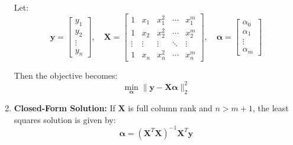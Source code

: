 \begin{example}
\begin{enumerate}
        Let:
        \[
        \mathbf{y} = 
        \begin{bmatrix} 
        y_1 \\ 
        y_2 \\ 
        \vdots \\ 
        y_n 
        \end{bmatrix}, \quad 
        \mathbf{X} = 
        \begin{bmatrix} 
        1 & x_1 & x_1^2 & \cdots & x_1^m \\ 
        1 & x_2 & x_2^2 & \cdots & x_2^m \\ 
        \vdots & \vdots & \vdots & \ddots & \vdots \\ 
        1 & x_n & x_n^2 & \cdots & x_n^m 
        \end{bmatrix}, \quad 
        \boldsymbol{\alpha} = 
        \begin{bmatrix} 
        \alpha_0 \\ 
        \alpha_1 \\ 
        \vdots \\ 
        \alpha_m 
        \end{bmatrix}
        \]
    
        Then the objective becomes:
        \[
        \min_{\boldsymbol{\alpha}} \| \mathbf{y} - \mathbf{X} \boldsymbol{\alpha} \|_2^2
        \]
    
        \item \textbf{Closed-Form Solution:} If $\mathbf{X}$ is full column rank and $n > m+1$, the least squares solution is given by:
        \[
        \boldsymbol{\alpha} = (\mathbf{X}^T \mathbf{X})^{-1} \mathbf{X}^T \mathbf{y}
        \]    
    \end{enumerate}
\end{example}

